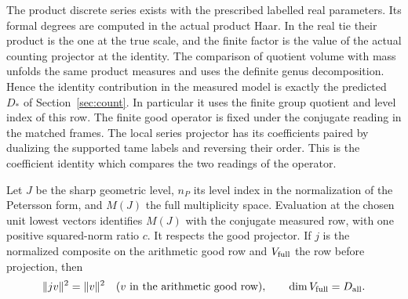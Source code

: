 The product discrete series exists with the prescribed
labelled real parameters. Its formal degrees are computed
in the actual product Haar. In the real tie their product
is the one at the true scale, and the finite factor is the
value of the actual counting projector at the identity.
The comparison of quotient volume with mass unfolds the
same product measures and uses the definite genus
decomposition. Hence the identity contribution in the
measured model is exactly the predicted \(D_*\) of
Section~\ref{sec:count}. In particular it uses the
finite group quotient and level index of this row. The
finite good operator is fixed under the conjugate reading
in the matched frames. The local series projector has
its coefficients paired by dualizing the supported tame
labels and reversing their order. This is the coefficient
identity which compares the two readings of the operator.
\label{cor:real-row-realization-4}

\begin{proposition}\label{prop:refined-real-row}
Let \(J\) be the sharp geometric level, \(n_P\) its level index
in the normalization of the Petersson form, and \(M(J)\) the full
multiplicity space. Evaluation at the chosen unit lowest vectors
identifies \(M(J)\) with the conjugate measured row, with one positive
squared-norm ratio \(c\). It respects the good projector. If \(j\) is the normalized composite on the arithmetic good row and \(V_{\rm full}\) the row before projection, then
\[
 \|jv\|^2=\|v\|^2\quad(v\text{ in the arithmetic good row}),\qquad \dim V_{\rm full}=D_{\mathrm{all}}.
\]
\end{proposition}

